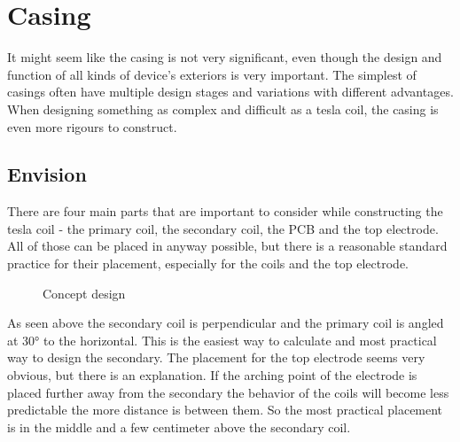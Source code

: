 \setchapterpreamble[u]{\margintoc}

\setcounter{chapter}{9}


\chapter{Casing}

It might seem like the casing is not very significant, even though the design and function of all kinds of device's exteriors is very important. The simplest of casings often have multiple design stages and variations with different advantages. When designing something as complex and difficult as a tesla coil, the casing is even more rigours to construct. 



\section{Envision}

There are four main parts that are important to consider while constructing the tesla coil - the primary coil, the secondary coil, the PCB and the top electrode. All of those can be placed in anyway possible, but there is a reasonable standard practice for their placement, especially for the coils and the top electrode. 

\begin{figure}
    \centering
    \caption{Concept design}
    \label{BD-envision}
\end{figure}

As seen above the secondary coil is perpendicular and the primary coil is angled at 30° to the horizontal. This is the easiest way to calculate and most practical way to design the secondary. The placement for the top electrode seems very obvious, but there is an explanation. If the arching point of the electrode is placed further away from the secondary the behavior of the coils will become less predictable the more distance is between them. So the most practical placement is in the middle and a few centimeter above the secondary coil. 

